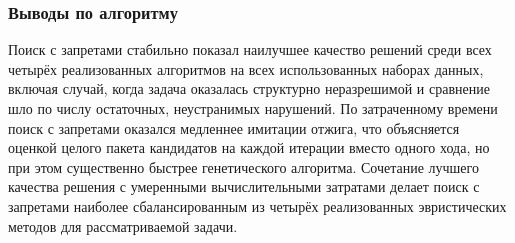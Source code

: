 \subsubsection { Выводы по алгоритму}

Поиск с запретами стабильно показал наилучшее качество решений среди всех четырёх реализованных алгоритмов на всех использованных наборах данных, включая случай, когда задача оказалась структурно неразрешимой и сравнение шло по числу остаточных, неустранимых нарушений. По затраченному времени поиск с запретами оказался медленнее имитации отжига, что объясняется оценкой целого пакета кандидатов на каждой итерации вместо одного хода, но при этом существенно быстрее генетического алгоритма. Сочетание лучшего качества решения с умеренными вычислительными затратами делает поиск с запретами наиболее сбалансированным из четырёх реализованных эвристических методов для рассматриваемой задачи.

